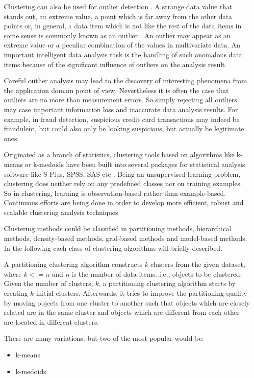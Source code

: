 Clustering can also be used for outlier detection \cite{Zoubi}. A strange data value that stands out, an extreme value, a point which is far away from the other data points or, in general, a data item which is not like the rest of the data items in some sense is commonly known as an outlier \cite{Aggarwal01Outlier}. An outlier may appear as an extreme value or a peculiar combination of the values in multivariate data. 
An important intelligent data analysis task is the handling of such anomalous data items because of the significant influence of outliers on the analysis result.

Careful outlier analysis may lead to the discovery of interesting phenomena from the application domain point of view. Nevertheless it is often the case that outliers are no more than measurement errors.
So simply rejecting all outliers may case important information loss and inaccurate data analysis results. For example, in fraud detection, suspicious credit card transactions may indeed be fraudulent, but could also only be looking suspicious, but actually be legitimate ones. 

Originated as a branch of statistics, clustering tools based on algorithms like k-means or k-medoids have been built into several packages for statistical analysis software like S-Plus, SPSS, SAS etc \cite{Han01Spatial}. Being an unsupervised learning problem, clustering  does neither rely on any predefined classes nor on training examples. So in clustering, learning is observation-based rather than example-based. 
Continuous efforts are being done in order to develop more efficient, robust and scalable clustering analysis techniques.

Clustering methods could be classified in partitioning methods, hierarchical methods, density-based methods, grid-based methods and model-based methods. In the following each class of clustering algorithms will briefly described.

A partitioning clustering algorithm constructs $k$ clusters from the given dataset, where $k <= n$ and $n$ is the number of data items, i.e., objects to be clustered. Given the number of clusters, $k$, a partitioning clustering algorithm starts by creating $k$ initial clusters. Afterwards, it tries to improve the partitioning quality by moving objects from one cluster to another such that objects which are closely related are in the same cluster and objects which are different from each other are located in different clusters.

There are many variations, but two of the most popular would be:
\begin{itemize}
\item k-means
\item k-medoids.
\end{itemize}

